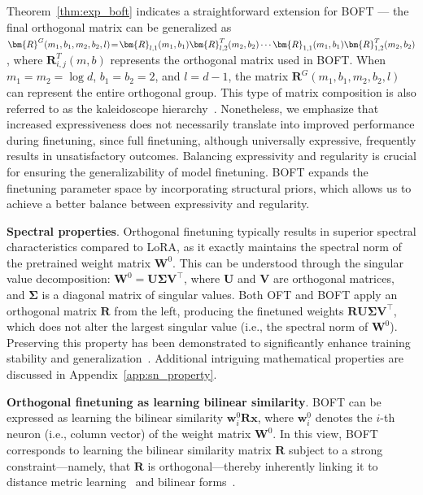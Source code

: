 Theorem~\ref{thm:exp_boft} indicates a straightforward extension for BOFT — the final orthogonal matrix can be generalized as $\thickmuskip=2mu \medmuskip=2mu \bm{R}^G(m_1,b_1,m_2,b_2,l)=\bm{R}_{l,1}(m_1,b_1)\bm{R}_{l,2}^T(m_2,b_2)\cdots\bm{R}_{1,1}(m_1,b_1)\bm{R}_{1,2}^T(m_2,b_2)$, where $\bm{R}_{i,j}^T(m,b)$ represents the orthogonal matrix used in BOFT. When $m_1=m_2=\log d$, $b_1=b_2=2$, and $l=d-1$, the matrix $\bm{R}^G(m_1,b_1,m_2,b_2,l)$ can represent the entire orthogonal group. This type of matrix composition is also referred to as the kaleidoscope hierarchy~\cite{dao2019kaleidoscope}. Nonetheless, we emphasize that increased expressiveness does not necessarily translate into improved performance during finetuning, since full finetuning, although universally expressive, frequently results in unsatisfactory outcomes. Balancing expressivity and regularity is crucial for ensuring the generalizability of model finetuning. BOFT expands the finetuning parameter space by incorporating structural priors, which allows us to achieve a better balance between expressivity and regularity.

\textbf{Spectral properties}. Orthogonal finetuning typically results in superior spectral characteristics compared to LoRA, as it exactly maintains the spectral norm of the pretrained weight matrix $\bm{W}^0$. This can be understood through the singular value decomposition: $\bm{W}^0=\bm{U}\bm{\Sigma}\bm{V}^\top$, where $\bm{U}$ and $\bm{V}$ are orthogonal matrices, and $\bm{\Sigma}$ is a diagonal matrix of singular values. Both OFT and BOFT apply an orthogonal matrix $\bm{R}$ from the left, producing the finetuned weights $\bm{R}\bm{U}\bm{\Sigma}\bm{V}^\top$, which does not alter the largest singular value (i.e., the spectral norm of $\bm{W}^0$). Preserving this property has been demonstrated to significantly enhance training stability and generalization~\cite{miyato2018spectral,yoshida2017spectral}. Additional intriguing mathematical properties are discussed in Appendix~\ref{app:sn_property}.

\textbf{Orthogonal finetuning as learning bilinear similarity}. BOFT can be expressed as learning the bilinear similarity $\bm{w}^0_i\bm{R}\bm{x}$, where $\bm{w}^0_i$ denotes the $i$-th neuron (i.e., column vector) of the weight matrix $\bm{W}^0$. In this view, BOFT corresponds to learning the bilinear similarity matrix $\bm{R}$ subject to a strong constraint—namely, that $\bm{R}$ is orthogonal—thereby inherently linking it to distance metric learning~\cite{xing2002distance} and bilinear forms~\cite{roman2005advanced}.

